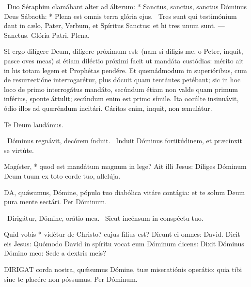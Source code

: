 \R\ Duo Séraphim clamábant alter ad álterum: * Sanctus, sanctus, sanctus Dóminus Deus Sábaoth: * Plena est omnis terra glória ejus. \V\ Tres sunt qui testimónium dant in cælo, Pater, Verbum, et Spíritus Sanctus: et hi tres unum sunt. — Sanctus. Glória Patri. Plena.


\lettrine[lines=2]{S}{I} ergo dilígere Deum, dilígere próximum est: (nam si díligis me, o Petre, inquit, pasce oves meas) si étiam diléctio próximi facit ut mandáta custódias: mérito ait in his totam legem et Prophétas pendére. Et quemádmodum in superióribus, cum de resurrectióne interrogarétur, plus dócuit quam tentántes petébant; sic in hoc loco de primo interrogátus mandáto, secúndum étiam non valde quam primum inférius, sponte áttulit; secúndum enim est primo símile. Ita occúlte insinuávit, ódio illos ad quæréndum incitári. Cáritas enim, inquit, non æmulátur.

Te Deum laudámus.


\V\ Dóminus regnávit, decórem índuit. \R\ Induit Dóminus fortitúdinem, et præcínxit se virtúte.

 Magíster, * quod est mandátum magnum in lege? Ait illi Jesus: Díliges Dóminum Deum tuum ex toto corde tuo, allelúja.


\lettrine[lines=2]{D}{A}, quǽsumus, Dómine, pópulo tuo diabólica vitáre contágia: et te solum Deum pura mente sectári. Per Dóminum.


\V\ Dirigátur, Dómine, orátio mea. \R\ Sicut incénsum in conspéctu tuo.

 Quid vobis * vidétur de Christo? cujus fílius est? Dicunt ei omnes: David. Dicit eis Jesus: Quómodo David in spíritu vocat eum Dóminum dicens: Dixit Dóminus Dómino meo: Sede a dextris meis?




\lettrine[lines=2]{D}{IRIGAT} corda nostra, quǽsumus Dómine, tuæ miseratiónis operátio: quia tibi sine te placére non póssumus. Per Dóminum.



